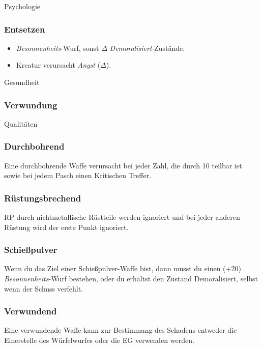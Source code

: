 \documentclass{article}
\begin{document}
\begin{multicols*}{3}
\begin{slsframe}{Psychologie}
        \subsubsection*{Entsetzen}
        \begin{itemize}
            \setlength\itemsep{0.1em}
            \item \textit{Besonnenheits}-Wurf, sonst $\Delta$ \textit{Demoralisiert}-Zustände. 
            \item Kreatur verursacht \textit{Angst} ($\Delta$).
        \end{itemize}

    \end{slsframe}

    \begin{slsframe}{Gesundheit}
        \subsubsection*{Verwundung}

    \end{slsframe}

    \begin{slsframe}{Qualitäten}
        \subsubsection*{Durchbohrend}
        Eine durchbohrende Waffe verursacht bei jeder Zahl, die durch 10 teilbar ist sowie bei jedem Pasch einen Kritischen Treffer.

        \subsubsection*{Rüstungsbrechend}
        RP durch nichtmetallische Rüstteile werden ignoriert und bei jeder anderen Rüstung wird der erste Punkt ignoriert.

        \subsubsection*{Schießpulver}
        Wenn du das Ziel einer Schießpulver-Waffe bist, dann musst du einen (+20) \textit{Besonnenheits}-Wurf bestehen, oder du erhältst den Zustand Demoralisiert, selbst wenn der Schuss verfehlt.

        \subsubsection*{Verwundend}
        Eine verwundende Waffe kann zur Bestimmung des Schadens entweder die Einerstelle des Würfelwurfes oder die EG verwenden werden.
        

\end{slsframe}
\end{multicols*}
\end{document}
